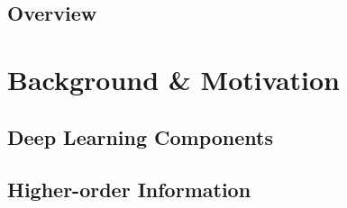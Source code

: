 




\frontmatter %


\pagestyle{pagenum.scrheadings}












\mainmatter%


\setchapterpreamble[u]{\margintoc}
\chapter{Overview}\label{chap:overview}



\part{Background \& Motivation}\label{part:background}

\setchapterpreamble[u]{\margintoc}
\chapter{Deep Learning Components}\label{chap:background::Paradigms}


\setchapterpreamble[u]{\margintoc}
\chapter{Higher-order Information}\label{chap:background::HigherOrder}


